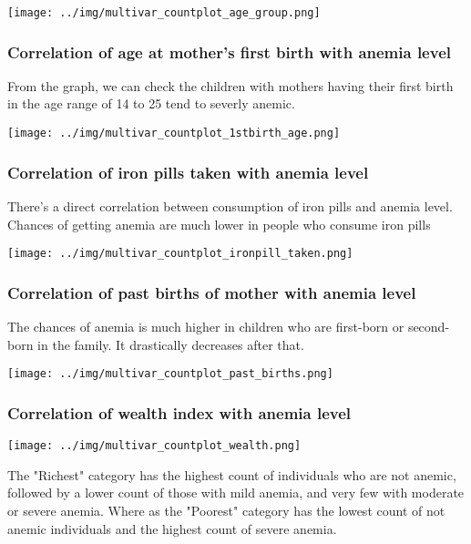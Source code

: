 \texttt{[image: ../img/multivar\_countplot\_age\_group.png]}

\subsubsection{Correlation of age at mother's first birth with anemia level}

From the graph, we can check the children with mothers having their first birth in the age range of 14 to 25 tend to severly anemic.

\texttt{[image: ../img/multivar\_countplot\_1stbirth\_age.png]}



\subsubsection{Correlation of iron pills taken with anemia level}

There's a direct correlation between consumption of iron pills and anemia level. Chances of getting anemia are much lower in people who consume iron pills

\texttt{[image: ../img/multivar\_countplot\_ironpill\_taken.png]}

\subsubsection{Correlation of past births of mother with anemia level}

The chances of anemia is much higher in children who are first-born or second-born in the family. It drastically decreases after that.

\texttt{[image: ../img/multivar\_countplot\_past\_births.png]}

\subsubsection{Correlation of wealth index with anemia level}

\texttt{[image: ../img/multivar\_countplot\_wealth.png]}

The "Richest" category has the highest count of individuals who are not anemic, followed by a lower count of those with mild anemia, and very few with moderate or severe anemia. Where as the "Poorest" category has the lowest count of not anemic individuals and the highest count of severe anemia.

